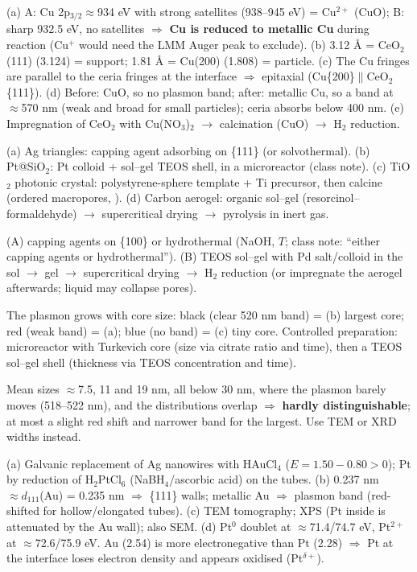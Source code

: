  (a) A: Cu 2p$_{3/2}\approx$934 eV with strong satellites (938--945 eV) = Cu$^{2+}$ (CuO)\extra; B: sharp 932.5 eV,
no satellites $\Rightarrow$ \textbf{Cu is reduced to metallic Cu} during reaction (Cu$^+$ would need the LMM Auger peak to exclude\extra).
(b) 3.12 \AA{} = CeO$_2$(111) (3.124) = support; 1.81 \AA{} = Cu(200) (1.808) = particle.
(c) The Cu fringes are parallel to the ceria fringes at the interface $\Rightarrow$ epitaxial (Cu\{200\}$\parallel$CeO$_2$\{111\}).
(d) Before: CuO, so no plasmon band; after: metallic Cu, so a band at $\approx$570 nm (weak and broad for small particles); ceria absorbs
below 400 nm. (e) Impregnation of CeO$_2$ with Cu(NO$_3$)$_2$ $\to$ calcination (CuO) $\to$ H$_2$ reduction.

 (a) Ag triangles: capping agent adsorbing on \{111\} (or solvothermal). (b) Pt@SiO$_2$: Pt colloid + sol--gel
TEOS shell, in a microreactor (class note). (c) TiO$_2$ photonic crystal: polystyrene-sphere template + Ti precursor, then
calcine (ordered macropores, ). (d) Carbon aerogel: organic sol--gel (resorcinol--formaldehyde\extra) $\to$
supercritical drying $\to$ pyrolysis in inert gas\extra.

 (A) capping agents on \{100\} or hydrothermal (NaOH, $T$; class note: ``either capping
agents or hydrothermal''). (B) TEOS sol--gel with Pd salt/colloid in the sol $\to$ gel $\to$ supercritical drying $\to$
H$_2$ reduction (or impregnate the aerogel afterwards; liquid may collapse pores\extra).

 The plasmon grows with core size: black (clear 520 nm band) = (b) largest core; red (weak band) = (a);
blue (no band) = (c) tiny core. Controlled preparation: microreactor with Turkevich core (size via citrate ratio and time),
then a TEOS sol--gel shell (thickness via TEOS concentration and time).

 Mean sizes $\approx$7.5, 11 and 19 nm\readoff, all below 30 nm, where the plasmon barely moves (518--522 nm), and the
distributions overlap $\Rightarrow$ \textbf{hardly distinguishable}; at most a slight red shift and narrower band for the largest.
Use TEM or XRD widths instead.

 (a) Galvanic replacement of Ag nanowires with HAuCl$_4$ ($E = 1.50-0.80>0$); Pt by reduction of
H$_2$PtCl$_6$ (NaBH$_4$/ascorbic acid) on the tubes. (b) 0.237 nm $\approx d_{111}$(Au) = 0.235 nm $\Rightarrow$ \{111\} walls;
metallic Au $\Rightarrow$ plasmon band (red-shifted for hollow/elongated tubes\extra). (c) TEM tomography; XPS (Pt inside is attenuated
by the Au wall); also SEM. (d) Pt$^0$ doublet at $\approx$71.4/74.7 eV, Pt$^{2+}$ at $\approx$72.6/75.9 eV\readoff. Au (2.54) is more
electronegative than Pt (2.28) $\Rightarrow$ Pt at the interface loses electron density and appears oxidised (Pt$^{\delta+}$).

